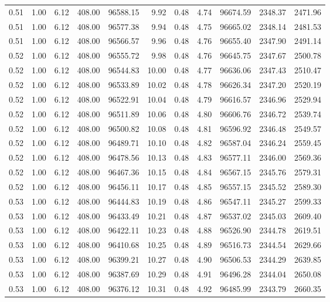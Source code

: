 \begin{table}[!ht]
\begin{tabular}{rrrrrrrrrrr}
0.51 & 1.00 & 6.12 & 408.00 & 96588.15 & 9.92 & 0.48 & 4.74 & 96674.59 & 2348.37 & 2471.96 \\
0.51 & 1.00 & 6.12 & 408.00 & 96577.38 & 9.94 & 0.48 & 4.75 & 96665.02 & 2348.14 & 2481.53 \\
0.51 & 1.00 & 6.12 & 408.00 & 96566.57 & 9.96 & 0.48 & 4.76 & 96655.40 & 2347.90 & 2491.14 \\
0.52 & 1.00 & 6.12 & 408.00 & 96555.72 & 9.98 & 0.48 & 4.76 & 96645.75 & 2347.67 & 2500.78 \\
0.52 & 1.00 & 6.12 & 408.00 & 96544.83 & 10.00 & 0.48 & 4.77 & 96636.06 & 2347.43 & 2510.47 \\
0.52 & 1.00 & 6.12 & 408.00 & 96533.89 & 10.02 & 0.48 & 4.78 & 96626.34 & 2347.20 & 2520.19 \\
0.52 & 1.00 & 6.12 & 408.00 & 96522.91 & 10.04 & 0.48 & 4.79 & 96616.57 & 2346.96 & 2529.94 \\
0.52 & 1.00 & 6.12 & 408.00 & 96511.89 & 10.06 & 0.48 & 4.80 & 96606.76 & 2346.72 & 2539.74 \\
0.52 & 1.00 & 6.12 & 408.00 & 96500.82 & 10.08 & 0.48 & 4.81 & 96596.92 & 2346.48 & 2549.57 \\
0.52 & 1.00 & 6.12 & 408.00 & 96489.71 & 10.10 & 0.48 & 4.82 & 96587.04 & 2346.24 & 2559.45 \\
0.52 & 1.00 & 6.12 & 408.00 & 96478.56 & 10.13 & 0.48 & 4.83 & 96577.11 & 2346.00 & 2569.36 \\
0.52 & 1.00 & 6.12 & 408.00 & 96467.36 & 10.15 & 0.48 & 4.84 & 96567.15 & 2345.76 & 2579.31 \\
0.52 & 1.00 & 6.12 & 408.00 & 96456.11 & 10.17 & 0.48 & 4.85 & 96557.15 & 2345.52 & 2589.30 \\
0.53 & 1.00 & 6.12 & 408.00 & 96444.83 & 10.19 & 0.48 & 4.86 & 96547.11 & 2345.27 & 2599.33 \\
0.53 & 1.00 & 6.12 & 408.00 & 96433.49 & 10.21 & 0.48 & 4.87 & 96537.02 & 2345.03 & 2609.40 \\
0.53 & 1.00 & 6.12 & 408.00 & 96422.11 & 10.23 & 0.48 & 4.88 & 96526.90 & 2344.78 & 2619.51 \\
0.53 & 1.00 & 6.12 & 408.00 & 96410.68 & 10.25 & 0.48 & 4.89 & 96516.73 & 2344.54 & 2629.66 \\
0.53 & 1.00 & 6.12 & 408.00 & 96399.21 & 10.27 & 0.48 & 4.90 & 96506.53 & 2344.29 & 2639.85 \\
0.53 & 1.00 & 6.12 & 408.00 & 96387.69 & 10.29 & 0.48 & 4.91 & 96496.28 & 2344.04 & 2650.08 \\
0.53 & 1.00 & 6.12 & 408.00 & 96376.12 & 10.31 & 0.48 & 4.92 & 96485.99 & 2343.79 & 2660.35 \\

\end{tabular}
\end{table}
